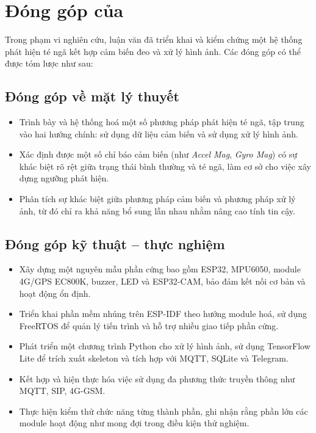 
\section{Đóng góp của \TENLUANVAN}
\label{sec:contribution}

Trong phạm vi nghiên cứu, luận văn đã triển khai và kiểm chứng một hệ thống phát hiện té ngã kết hợp cảm biến đeo và xử lý hình ảnh. Các đóng góp có thể được tóm lược như sau:

\subsection*{Đóng góp về mặt lý thuyết}
\begin{itemize}
    \item Trình bày và hệ thống hoá một số phương pháp phát hiện té ngã, tập trung vào hai hướng chính: sử dụng dữ liệu cảm biến và sử dụng xử lý hình ảnh.
    \item Xác định được một số chỉ báo cảm biến (như \textit{Accel Mag}, \textit{Gyro Mag}) có sự khác biệt rõ rệt giữa trạng thái bình thường và té ngã, làm cơ sở cho việc xây dựng ngưỡng phát hiện.
    \item Phân tích sự khác biệt giữa phương pháp cảm biến và phương pháp xử lý ảnh, từ đó chỉ ra khả năng bổ sung lẫn nhau nhằm nâng cao tính tin cậy.
\end{itemize}

\subsection*{Đóng góp kỹ thuật – thực nghiệm}
\begin{itemize}
    \item Xây dựng một nguyên mẫu phần cứng bao gồm ESP32, MPU6050, module 4G/GPS EC800K, buzzer, LED và ESP32-CAM, bảo đảm kết nối cơ bản và hoạt động ổn định.
    \item Triển khai phần mềm nhúng trên ESP-IDF theo hướng module hoá, sử dụng FreeRTOS để quản lý tiến trình và hỗ trợ nhiều giao tiếp phần cứng.
    \item Phát triển một chương trình Python cho xử lý hình ảnh, sử dụng TensorFlow Lite để trích xuất skeleton và tích hợp với MQTT, SQLite và Telegram.
    \item Kết hợp và hiện thực hóa việc sử dụng đa phương thức truyền thông như  MQTT, SIP, 4G-GSM.
    \item Thực hiện kiểm thử chức năng từng thành phần, ghi nhận rằng phần lớn các module hoạt động như mong đợi trong điều kiện thử nghiệm.
\end{itemize}

